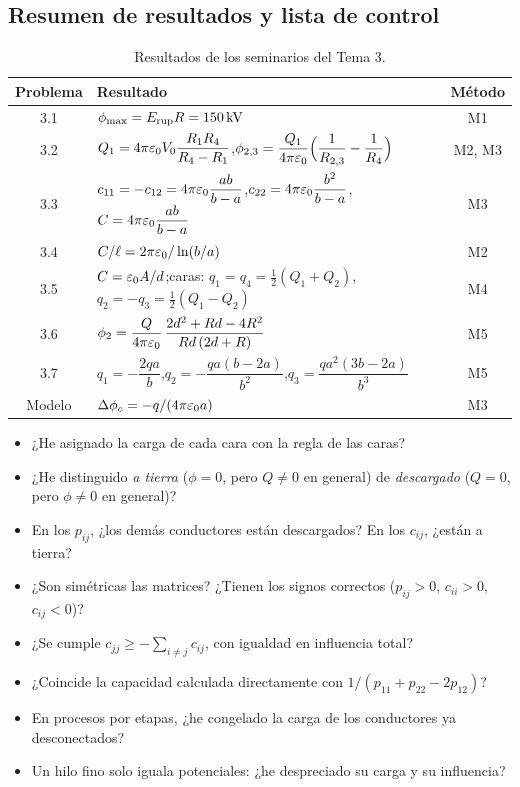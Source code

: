 \subsection{Resumen de resultados y lista de control}\label{sem:resumen}
\begin{table}[ht]
\centering
\caption{Resultados de los seminarios del Tema 3.}
\label{tab:resultados}
\small
\begin{tabular}{@{}clc@{}}
  \toprule
  Problema & Resultado & Método\\
  \midrule
  3.1 & $\phi_{\max}=E_{\mathrm{rup}} R=150\,\mathrm{kV}$ & M1\\[3pt]
  3.2 & $Q_1=4\pi\varepsilon_{0} V_0\dfrac{R_1R_4}{R_4-R_1}$,\quad $\phi_{2,3}=\dfrac{Q_1}{4\pi\varepsilon_{0}}\Bigl(\dfrac{1}{R_{2,3}}-\dfrac{1}{R_4}\Bigr)$ & M2, M3\\[10pt]
  3.3 & $c_{11}=-c_{12}=4\pi\varepsilon_{0}\dfrac{ab}{b-a}$,\quad $c_{22}=4\pi\varepsilon_{0}\dfrac{b^{2}}{b-a}$,\quad $C=4\pi\varepsilon_{0}\dfrac{ab}{b-a}$ & M3\\[10pt]
  3.4 & $C/\ell=2\pi\varepsilon_{0}/\ln(b/a)$ & M2\\[3pt]
  3.5 & $C=\varepsilon_{0} A/d$;\quad caras: $q_1=q_4=\tfrac12(Q_1+Q_2)$,\ $q_2=-q_3=\tfrac12(Q_1-Q_2)$ & M4\\[4pt]
  3.6 & $\phi_2=\dfrac{Q}{4\pi\varepsilon_{0}}\,\dfrac{2d^{2}+Rd-4R^{2}}{Rd\,(2d+R)}$ & M5\\[10pt]
  3.7 & $q_1=-\dfrac{2qa}{b}$,\quad $q_2=-\dfrac{qa(b-2a)}{b^{2}}$,\quad $q_3=\dfrac{qa^{2}(3b-2a)}{b^{3}}$ & M5\\[10pt]
  Modelo & $\Delta\phi_c=-q/(4\pi\varepsilon_{0} a)$ & M3\\
  \bottomrule
\end{tabular}
\end{table}

\begin{receta}
\begin{itemize}
  \item ¿He asignado la carga de cada cara con la regla de las caras?
  \item ¿He distinguido \emph{a tierra} ($\phi=0$, pero $Q\neq0$ en general) de \emph{descargado} ($Q=0$, pero $\phi\neq0$ en general)?
  \item En los $p_{ij}$, ¿los demás conductores están descargados? En los $c_{ij}$, ¿están a tierra?
  \item ¿Son simétricas las matrices? ¿Tienen los signos correctos ($p_{ij}>0$, $c_{ii}>0$, $c_{ij}<0$)?
  \item ¿Se cumple $c_{jj}\ge-\sum_{i\neq j}c_{ij}$, con igualdad en influencia total?
  \item ¿Coincide la capacidad calculada directamente con $1/(p_{11}+p_{22}-2p_{12})$?
  \item En procesos por etapas, ¿he congelado la carga de los conductores ya desconectados?
  \item Un hilo fino solo iguala potenciales: ¿he despreciado su carga y su influencia?
\end{itemize}
\end{receta}
